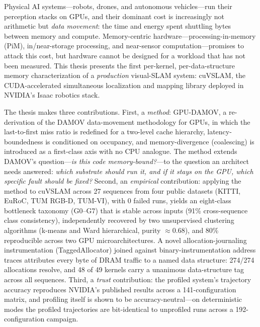 Physical AI systems---robots, drones, and autonomous vehicles---run their
perception stacks on GPUs, and their dominant cost is increasingly not
arithmetic but \emph{data movement}: the time and energy spent shuttling bytes
between memory and compute. Memory-centric hardware---processing-in-memory
(PiM), in/near-storage processing, and near-sensor computation---promises to
attack this cost, but hardware cannot be designed for a workload that has not
been measured. This thesis presents the first per-kernel,
per-data-structure memory characterization of a \emph{production} visual-SLAM
system: cuVSLAM, the CUDA-accelerated simultaneous localization and mapping
library deployed in NVIDIA's Isaac robotics stack.

The thesis makes three contributions. First, a \emph{method}: GPU-DAMOV, a
re-derivation of the DAMOV data-movement methodology for GPUs, in which the
last-to-first miss ratio is redefined for a two-level cache hierarchy,
latency-boundedness is conditioned on occupancy, and memory-divergence
(coalescing) is introduced as a first-class axis with no CPU analogue. The
method extends DAMOV's question---\emph{is this code memory-bound?}---to the
question an architect needs answered: \emph{which substrate should run it, and
if it stays on the GPU, which specific fault should be fixed?} Second, an
\emph{empirical} contribution: applying the method to cuVSLAM across 27
sequences from four public datasets (KITTI, EuRoC, TUM RGB-D, TUM-VI), with
0 failed runs, yields an eight-class bottleneck taxonomy (G0--G7) that is
stable across inputs (91\% cross-sequence class consistency), independently
recovered by two unsupervised clustering algorithms (k-means and Ward
hierarchical, purity $\approx$0.68), and 80\% reproducible across two GPU
microarchitectures. A novel allocation-journaling instrumentation
(TaggedAllocator) joined against binary-instrumentation address traces
attributes every byte of DRAM traffic to a named data structure: 274/274
allocations resolve, and 48 of 49 kernels carry a unanimous data-structure tag
across all sequences. Third, a \emph{trust} contribution: the profiled
system's trajectory accuracy reproduces NVIDIA's published results across a
141-configuration matrix, and profiling itself is shown to be
accuracy-neutral---on deterministic modes the profiled trajectories are
bit-identical to unprofiled runs across a 192-configuration campaign.


